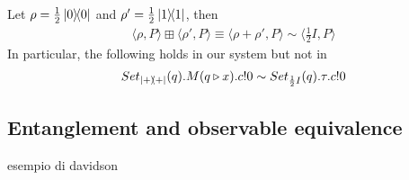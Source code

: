 
\begin{example}
Let $\rho = \frac{1}{2} \ket{0}\!\!\bra{0}$ and $\rho' = \frac{1}{2} \ket{1}\!\!\bra{1}$, then
\begin{align*}
	\langle \rho, P \rangle \boxplus \langle \rho', P \rangle \equiv \langle \rho + \rho', P \rangle \sim \langle \frac{1}{2} I, P \rangle
\end{align*}
In particular, the following holds in our system but not in~\cite{Feng:2012, Deng:2012}
\begin{align*}
	Set_{\ket{+}\!\!\bra{+}}(q).M(q \triangleright x).c!0 \sim Set_{\frac{1}{2} I}(q).\tau.c!0
\end{align*}


\subsection{Entanglement and observable equivalence}
esempio di davidson

\end{example}

